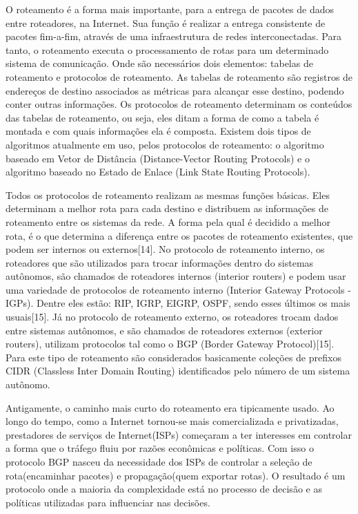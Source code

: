 \documentclass[12pt,a4paper]{report}
\begin{document}
O roteamento \'e a forma mais importante, para a entrega de pacotes de dados entre roteadores, na Internet. Sua fun\c{c}\~ao \'e realizar a entrega consistente de pacotes fim-a-fim, atrav\'es de uma infraestrutura de redes interconectadas. Para tanto, o roteamento executa o processamento de rotas para um determinado sistema de comunica\c{c}\~ao. Onde s\~ao necess\'arios dois elementos: tabelas de roteamento e protocolos de roteamento. As tabelas de roteamento s\~ao registros de endereços de destino associados as m\'etricas para alcan\c{c}ar esse destino, podendo conter outras informa\c{c}\~oes. Os protocolos de roteamento determinam os conte\'udos das tabelas de roteamento, ou seja, eles ditam a forma de como a tabela \'e montada e com quais informa\c{c}\~oes ela \'e composta. Existem dois tipos de algoritmos atualmente em uso, pelos protocolos de roteamento: o algoritmo baseado em Vetor de Dist\^ancia (Distance-Vector Routing Protocols) e o algoritmo baseado no Estado de Enlace (Link State Routing Protocols).

Todos os protocolos de roteamento realizam as mesmas fun\c{c}\~oes b\'asicas. Eles determinam a melhor rota para cada destino e distribuem as informa\c{c}\~oes de roteamento entre os sistemas da rede. A forma pela qual \'e decidido a melhor rota, \'e o que determina a diferen\c{c}a entre os pacotes de roteamento existentes, que podem ser internos ou externos[14]. No protocolo de roteamento interno, os roteadores que s\~ao utilizados para trocar informa\c{c}\~oes dentro do sistemas aut\^onomos, s\~ao chamados de roteadores internos (interior routers) e podem usar uma variedade de protocolos de roteamento interno (Interior Gateway Protocols - IGPs). Dentre eles est\~ao: RIP, IGRP, EIGRP, OSPF, sendo esses \'ultimos os mais usuais[15]. J\'a no protocolo de roteamento externo, os roteadores trocam dados entre sistemas aut\^onomos, e s\~ao chamados de roteadores externos (exterior routers), utilizam protocolos tal como o BGP (Border Gateway Protocol)[15]. Para este tipo de roteamento s\~ao considerados basicamente cole\c{c}\~oes de prefixos CIDR (Classless Inter Domain Routing) identificados pelo n\'umero de um sistema aut\^onomo.

Antigamente, o caminho mais curto do roteamento era tipicamente usado. Ao longo do tempo, como a Internet tornou-se mais comercializada e privatizadas, prestadores de servi\c{c}os de Internet(ISPs) come\c{c}aram a ter interesses em controlar a forma que o tr\'afego fluiu por raz\~oes econ\^omicas e pol\'iticas. Com isso o protocolo BGP nasceu da necessidade dos ISPs de controlar a sele\c{c}\~ao de rota(encaminhar pacotes) e propaga\c{c}\~ao(quem exportar rotas). O resultado \'e um protocolo onde a maioria da complexidade est\'a no processo de decis\~ao e as pol\'iticas utilizadas para influenciar nas decis\~oes.
\end{document}
